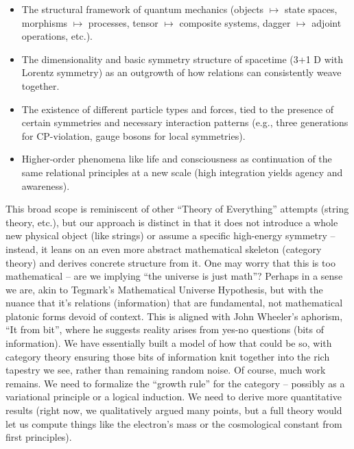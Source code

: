 \documentclass{article}
\begin{document}
\begin{itemize}
\item The structural framework of quantum mechanics (objects $\mapsto$ state spaces, morphisms $\mapsto$ processes, tensor $\mapsto$ composite systems, dagger $\mapsto$ adjoint operations, etc.).
\item The dimensionality and basic symmetry structure of spacetime (3+1 D with Lorentz symmetry) as an outgrowth of how relations can consistently weave together\cite{tegmark1997}.
\item The existence of different particle types and forces, tied to the presence of certain symmetries and necessary interaction patterns (e.g., three generations for CP-violation\cite{kobayashi1973}, gauge bosons for local symmetries).
\item Higher-order phenomena like life and consciousness as continuation of the same relational principles at a new scale (high integration yields agency and awareness).
\end{itemize}

This broad scope is reminiscent of other “Theory of Everything” attempts (string theory, etc.), but our approach is distinct in that it does not introduce a whole new physical object (like strings) or assume a specific high-energy symmetry – instead, it leans on an even more abstract mathematical skeleton (category theory) and derives concrete structure from it. One may worry that this is too mathematical – are we implying “the universe is just math”? Perhaps in a sense we are, akin to Tegmark’s Mathematical Universe Hypothesis, but with the nuance that it’s relations (information) that are fundamental, not mathematical platonic forms devoid of context. This is aligned with John Wheeler’s aphorism, “It from bit”, where he suggests reality arises from yes-no questions (bits of information)\cite{wheeler1989}. We have essentially built a model of how that could be so, with category theory ensuring those bits of information knit together into the rich tapestry we see, rather than remaining random noise. Of course, much work remains. We need to formalize the “growth rule” for the category – possibly as a variational principle or a logical induction. We need to derive more quantitative results (right now, we qualitatively argued many points, but a full theory would let us compute things like the electron’s mass or the cosmological constant from first principles).
\end{document}
